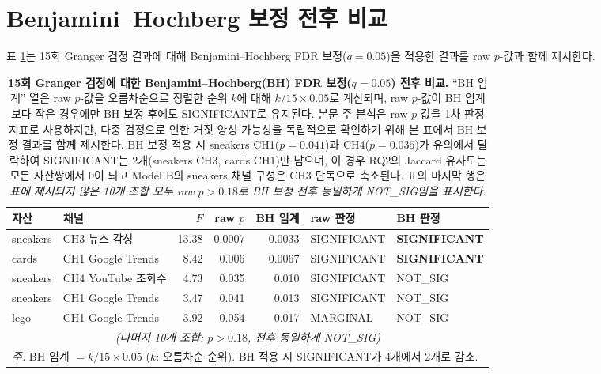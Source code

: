 \documentclass[11pt, a4paper, twocolumn]{article}
\begin{document}



\appendix

\section{Benjamini--Hochberg 보정 전후 비교}\label{sec:appendix-bh}

표 \ref{tab:bh}는 15회 Granger 검정 결과에 대해 Benjamini--Hochberg
FDR 보정($q=0.05$)을 적용한 결과를 raw $p$-값과 함께 제시한다.

\begin{table}[!tbp]
\centering\small
\caption[Granger 검정 BH 보정 전후 비교]{\textbf{15회 Granger 검정에
대한 Benjamini--Hochberg(BH) FDR 보정($q=0.05$) 전후 비교.}
``BH 임계'' 열은 raw $p$-값을 오름차순으로 정렬한 순위 $k$에 대해
$k/15 \times 0.05$로 계산되며, raw $p$-값이 BH 임계보다 작은 경우에만
BH 보정 후에도 SIGNIFICANT로 유지된다. 본문 주 분석은 raw $p$-값을
1차 판정 지표로 사용하지만, 다중 검정으로 인한 거짓 양성 가능성을
독립적으로 확인하기 위해 본 표에서 BH 보정 결과를 함께 제시한다.
BH 보정 적용 시 sneakers CH1($p=0.041$)과 CH4($p=0.035$)가 유의에서
탈락하여 SIGNIFICANT는 2개(sneakers CH3, cards CH1)만 남으며, 이
경우 RQ2의 Jaccard 유사도는 모든 자산쌍에서 0이 되고 Model B의
sneakers 채널 구성은 CH3 단독으로 축소된다. 표의 마지막 행은
\emph{표에 제시되지 않은 10개 조합 모두 raw $p > 0.18$로 BH 보정 전후
동일하게 NOT\_SIG임을 표시한다.}}
\label{tab:bh}
\begin{tabular}{llrrrll}
\toprule
자산 & 채널 & $F$ & raw $p$ & BH 임계 & raw 판정 & BH 판정 \\
\midrule
sneakers & CH3 뉴스 감성     & 13.38 & 0.0007 & 0.0033 & SIGNIFICANT & \textbf{SIGNIFICANT} \\
cards    & CH1 Google Trends  &  8.42 & 0.006  & 0.0067 & SIGNIFICANT & \textbf{SIGNIFICANT} \\
sneakers & CH4 YouTube 조회수 &  4.73 & 0.035  & 0.010  & SIGNIFICANT & NOT\_SIG \\
sneakers & CH1 Google Trends  &  3.47 & 0.041  & 0.013  & SIGNIFICANT & NOT\_SIG \\
lego     & CH1 Google Trends  &  3.92 & 0.054  & 0.017  & MARGINAL    & NOT\_SIG \\
\multicolumn{7}{c}{\textit{(나머지 10개 조합: $p > 0.18$, 전후 동일하게 NOT\_SIG)}} \\
\bottomrule
\multicolumn{7}{l}{\textit{주.} BH 임계 $= k/15 \times 0.05$ ($k$: 오름차순 순위).
BH 적용 시 SIGNIFICANT가 4개에서 2개로 감소.}
\end{tabular}
\end{table}
\end{document}
